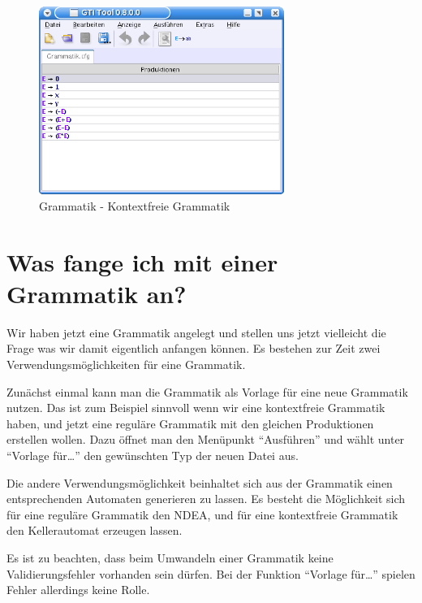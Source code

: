 \begin{figure}[h]
\begin{center}
\includegraphics[width=8cm]{images/cfg_example.png}
\caption{Grammatik - Kontextfreie Grammatik}
\end{center}
\end{figure}

\section{Was fange ich mit einer Grammatik an?}

Wir haben jetzt eine Grammatik angelegt und stellen uns jetzt vielleicht die
Frage was wir damit eigentlich anfangen können. Es bestehen zur Zeit zwei
Verwendungsmöglichkeiten für eine Grammatik.\vspace{10pt}

Zunächst einmal kann man die Grammatik als Vorlage für eine neue Grammatik
nutzen. Das ist zum Beispiel sinnvoll wenn wir eine kontextfreie Grammatik
haben, und jetzt eine reguläre Grammatik mit den gleichen Produktionen
erstellen wollen. Dazu öffnet man den Menüpunkt "`Ausführen"' und wählt unter
"`Vorlage für\ldots"' den gewünschten Typ der neuen Datei aus.\vspace{10pt}

Die andere Verwendungsmöglichkeit beinhaltet sich aus der Grammatik einen
ent\-sprechen\-den Automaten generieren zu lassen. Es besteht die Möglichkeit
sich für eine reguläre Grammatik den NDEA, und für eine kontextfreie Grammatik den Kellerautomat
erzeugen lassen.\vspace{10pt}

Es ist zu beachten, dass beim Umwandeln einer Grammatik keine
Validierungsfehler vorhanden sein dürfen. Bei der Funktion "`Vorlage
für\ldots"' spielen Fehler allerdings keine Rolle.




